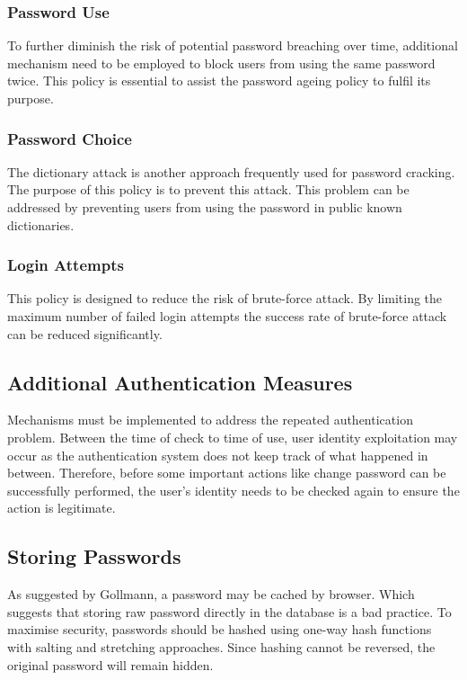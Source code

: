 \documentclass{article}
\begin{document}
\subsubsection{Password Use}
To further diminish the risk of potential password breaching over time, additional mechanism 
need to be employed to block users from using the same password twice. This policy is essential 
to assist the password ageing policy to fulfil its purpose.

\subsubsection{Password Choice}
The dictionary attack is another approach frequently used for password cracking. The purpose of 
this policy is to prevent this attack. This problem can be addressed by preventing users from 
using the password in public known dictionaries.

\subsubsection{Login Attempts}
This policy is designed to reduce the risk of brute-force attack. By limiting the maximum number of 
failed login attempts the success rate of brute-force attack can be reduced significantly.

\subsection{Additional Authentication Measures}
Mechanisms must be implemented to address the repeated authentication problem. 
Between the time of check to time of use, user identity exploitation may occur as the 
authentication system does not keep track of what happened in between. 
Therefore, before some important actions like change password can be successfully performed, 
the user's identity needs to be checked again to ensure the action is legitimate.

\subsection{Storing Passwords}
As suggested by Gollmann, a password may be cached by browser\cite{GollmannDieter2011Cs/D}. Which 
suggests that storing raw password directly in the database is a bad practice. To maximise security, 
passwords should be hashed using one-way hash functions with salting and stretching approaches\cite{FergusonNiels2010Ce:d}.
Since hashing cannot be reversed, the original password will remain hidden.
\end{document}
